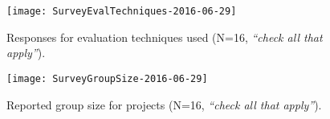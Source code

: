 

\begin{figure}[htb]
    \centering
    \texttt{[image: SurveyEvalTechniques-2016-06-29]}
   \caption{Responses for evaluation techniques used (N=16, \emph{``check all that apply''}).}
   \label{fig:questionnaire:evaltechniques}
\end{figure}
    
    
\begin{figure}[htb]
    \centering
    \texttt{[image: SurveyGroupSize-2016-06-29]}
   \caption{Reported group size for projects (N=16, \emph{``check all that apply''}).}
   \label{fig:questionnaire:groupsize}
\end{figure}





